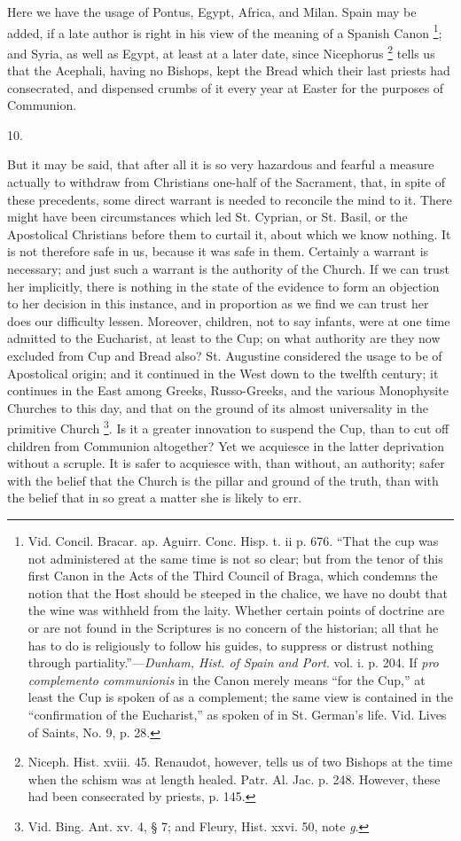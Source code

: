 Here we have the usage of Pontus, Egypt, Africa, and
Milan. Spain may be added, if a late author is right in
his view of the meaning of a Spanish Canon \footnote{Vid. Concil. Bracar. ap. Aguirr.
Conc. Hisp. t. ii p. 676. ``That the cup was not
administered at the same time is not so clear; but from
the tenor of this first Canon in the Acts of the Third
Council of Braga, which condemns the notion that the Host
should be steeped in the chalice, we have no doubt that
the wine was withheld from the laity. Whether certain
points of doctrine are or are not found in the Scriptures
is no concern of the historian; all that he has to do is
religiously to follow his guides, to suppress or distrust
nothing through partiality.''—\emph{Dunham, Hist.
of Spain and Port}. vol. i. p. 204. If \emph{pro
complemento communionis} in the Canon merely means
``for the Cup,'' at least the Cup is spoken of as
a complement; the same view is contained in the
``confirmation of the Eucharist,'' as spoken of
in St. German's life. Vid. Lives of Saints, No. 9, p.
28.}; and
Syria, as well as Egypt, at least at a later date, since
Nicephorus \footnote{Niceph. Hist. xviii. 45.
Renaudot, however, tells us of two Bishops at the time
when the schism was at length healed. Patr. Al. Jac. p.
248. However, these had been consecrated by priests, p.
145.}
tells us that the Acephali, having no Bishops, kept the
Bread which their last priests had consecrated, and
dispensed crumbs of it every year at Easter for the
purposes of Communion.

10.

But it may be said, that after all it is so very
hazardous and fearful a measure actually to withdraw from
Christians one-half of the Sacrament, that, in spite of
these precedents, some direct warrant is needed to
reconcile the mind to it. There might have been
circumstances which led St. Cyprian, or St. Basil, or the
Apostolical Christians before them to curtail it, about
which we know nothing. It is not therefore safe in us,
because it was safe in them. Certainly a warrant is
necessary; and just such a warrant is the authority of
the Church. If we can trust her implicitly, there is
nothing in the state of the evidence to form an objection
to her decision in this instance, and in proportion as we
find we can trust her does our difficulty lessen.
Moreover, children, not to say infants, were at one time
admitted to the Eucharist, at least to the Cup; on what
authority are they now excluded from Cup and Bread also?
St. Augustine considered the usage to be of Apostolical
origin; and it continued in the West down to the twelfth
century; it continues in the East among Greeks,
Russo-Greeks, and the various Monophysite Churches to
this day, and that on the ground of its almost
universality in the primitive Church \footnote{Vid. Bing. Ant. xv. 4, § 7;
and Fleury, Hist. xxvi. 50, note \emph{g}.}. Is it a greater innovation
to suspend the Cup, than to cut off children from
Communion altogether? Yet we acquiesce in the latter
deprivation without a scruple. It is safer to acquiesce
with, than without, an authority; safer with the belief
that the Church is the pillar and ground of the truth,
than with the belief that in so great a matter she is
likely to err.

